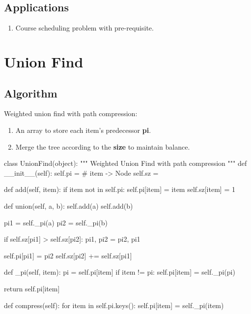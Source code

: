 \subsection{Applications}
\begin{enumerate}
\item Course scheduling problem with pre-requisite. 
\end{enumerate}

\section{Union Find}
\subsection{Algorithm}
Weighted union find with path compression: 
\begin{enumerate}
\item An array to store each item's predecessor \textbf{pi}. 
\item Merge the tree according to the \textbf{size} to maintain balance. 
\end{enumerate}
\begin{python}
class UnionFind(object):
    """
    Weighted Union Find with path compression
    """
    def __init__(self):
        self.pi = {}  # item -> Node
        self.sz = {}

    def add(self, item):
        if item not in self.pi:
            self.pi[item] = item
            self.sz[item] = 1

    def union(self, a, b):
        self.add(a)
        self.add(b)

        pi1 = self._pi(a)
        pi2 = self._pi(b)

        if self.sz[pi1] > self.sz[pi2]:
            pi1, pi2 = pi2, pi1

        self.pi[pi1] = pi2
        self.sz[pi2] += self.sz[pi1]

    def _pi(self, item):
        pi = self.pi[item]
        if item != pi:
            self.pi[item] = self._pi(pi)

        return self.pi[item]

    def compress(self):
        for item in self.pi.keys():
            self.pi[item] = self._pi(item)
\end{python}

